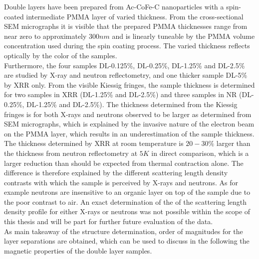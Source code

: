 \documentclass[\main/dresen_thesis.tex]{subfiles}
\begin{document}
  \label{sec:doublelayers:structuralCharacterization:summary}

  Double layers have been prepared from Ac-CoFe-C nanoparticles with a spin-coated intermediate PMMA layer of varied thickness.
  From the cross-sectional SEM micrographs it is visible that the prepared PMMA thicknesses range from near zero to approximately $300 \unit{nm}$ and is linearly tuneable by the PMMA volume concentration used during the spin coating process.
  The varied thickness reflects optically by the color of the samples.
  \\

  Furthermore, the four samples DL-0.125\%, DL-0.25\%, DL-1.25\% and DL-2.5\% are studied by X-ray and neutron reflectometry, and one thicker sample DL-5\% by XRR only.
  From the visible Kiessig fringes, the sample thickness is determined for two samples in XRR (DL-1.25\% and DL-2.5\%) and three samples in NR (DL-0.25\%, DL-1.25\% and DL-2.5\%).
  The thickness determined from the Kiessig fringes is for both X-rays and neutrons observed to be larger as determined from SEM micrographs, which is explained by the invasive nature of the electron beam on the PMMA layer, which results in an underestimation of the sample thickness.
  The thickness determined by XRR at room temperature is $20 - 30\%$ larger than the thickness from neutron reflectometry at $5 \unit{K}$ in direct comparison, which is a larger reduction than should be expected from thermal contraction alone.
  The difference is therefore explained by the different scattering length density contrasts with which the sample is perceived by X-rays and neutrons.
  As for example neutrons are insensitive to an organic layer on top of the sample due to the poor contrast to air.
  An exact determination of the of the scattering length density profile for either X-rays or neutrons was not possible within the scope of this thesis and will be part for further future evaluation of the data.
  \\

  As main takeaway of the structure determination, order of magnitudes for the layer separations are obtained, which can be used to discuss in the following the magnetic properties of the double layer samples.
\end{document}
